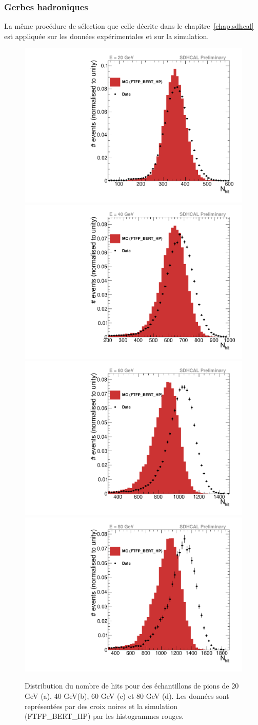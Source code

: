 \subsubsection{Gerbes hadroniques}
La même procédure de sélection que celle décrite dans le chapitre~\ref{chap.sdhcal} est appliquée sur les données expérimentales et sur la simulation. 
\begin{figure}[!ht]
  \centering
  \includegraphics[width=.45\textwidth]{Digitizer/figs/nhit_pi-_20GeV_AugSep2012.pdf}
  \includegraphics[width=.45\textwidth]{Digitizer/figs/nhit_pi-_40GeV_AugSep2012.pdf}
  \includegraphics[width=.45\textwidth]{Digitizer/figs/nhit_pi-_60GeV_AugSep2012.pdf}
  \includegraphics[width=.45\textwidth]{Digitizer/figs/nhit_pi-_80GeV_AugSep2012.pdf}
  \caption{Distribution du nombre de hits pour des échantillons de pions de 20 GeV (a), 40 GeV(b), 60 GeV (c) et 80 GeV (d). Les données sont représentées par des croix noires et la simulation (FTFP\_BERT\_HP) par les histogrammes rouges. \label{fig.pi-nhit}}
\end{figure}
